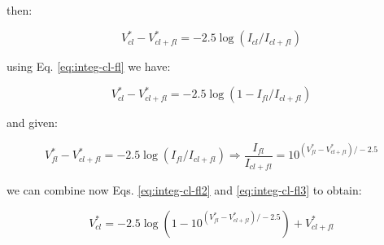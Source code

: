 \documentclass[10pt]{article}
\begin{document}
then:

\begin{equation}
V^*_{cl} - V^*_{cl+fl} = -2.5 \log(I_{cl}/I_{cl+fl})
\end{equation}

using Eq. \ref{eq:integ-cl-fl} we have:

\begin{equation}
V^*_{cl} - V^*_{cl+fl} = -2.5 \log(1 - I_{fl}/I_{cl+fl})
\label{eq:integ-cl-fl2}
\end{equation}

and given:

\begin{equation}
V^*_{fl} - V^*_{cl+fl} = -2.5 \log(I_{fl}/I_{cl+fl}) \Rightarrow \frac{I_{fl}}{I_{cl+fl}} = 10^{(V^*_{fl} - V^*_{cl+fl})/-2.5}
\label{eq:integ-cl-fl3}
\end{equation}

we can combine now Eqs. \ref{eq:integ-cl-fl2} and \ref{eq:integ-cl-fl3} to obtain:

\begin{equation}
V^*_{cl} = -2.5 \log(1 - 10^{(V^*_{fl} - V^*_{cl+fl})/-2.5}) + V^*_{cl+fl}
\end{equation}
\end{document}
